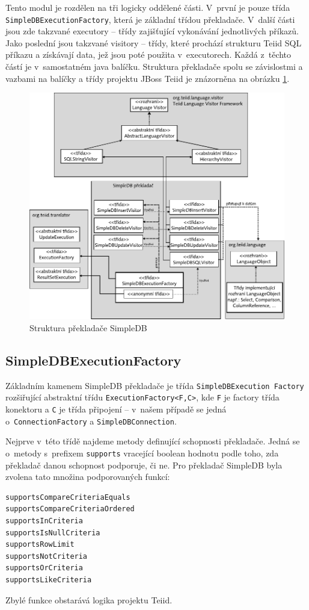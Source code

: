\documentclass[oneside,12pt]{fithesis2}
\begin{document}
Tento modul je rozdělen na tři logicky oddělené části. V~první je pouze třída \texttt{SimpleDBExecutionFactory}, která je základní třídou překladače. V~další části jsou zde takzvané executory -- třídy zajišťující vykonávání jednotlivých příkazů. Jako poslední jsou takzvané visitory -- třídy, které prochází strukturu Teiid SQL příkazu a získávají data, jež jsou poté použita v~executorech. Každá z~těchto částí je v~samostatném java balíčku. Struktura překladače spolu se závislostmi a vazbami na balíčky a třídy projektu JBoss Teiid je znázorněna na obrázku \ref{translatorStructure}.
\begin{figure}[h]
 \centering
 \includegraphics[scale=0.8]{TranslatorStructure}
 \caption{Struktura překladače SimpleDB}
 \label{translatorStructure}
\end{figure}
\subsection{SimpleDBExecutionFactory}
Základním kamenem SimpleDB překladače je třída \texttt{SimpleDBExecution Factory} rozšiřující abstraktní třídu \texttt{ExecutionFactory<F,C>}, kde \texttt{F} je factory třída konektoru a \texttt{C} je třída připojení -- v~našem případě se jedná o~\texttt{ConnectionFactory} a \texttt{SimpleDBConnection}.

Nejprve v~této třídě najdeme metody definující schopnosti překladače. Jedná se o~metody s~prefixem \texttt{supports} vracející boolean hodnotu podle toho, zda překladač danou schopnost podporuje, či ne. Pro překladač SimpleDB byla zvolena tato množina podporovaných funkcí: 
\begin{verbatim}
supportsCompareCriteriaEquals
supportsCompareCriteriaOrdered
supportsInCriteria
supportsIsNullCriteria
supportsRowLimit
supportsNotCriteria
supportsOrCriteria
supportsLikeCriteria
\end{verbatim}
Zbylé funkce obstarává logika projektu Teiid.
\end{document}
